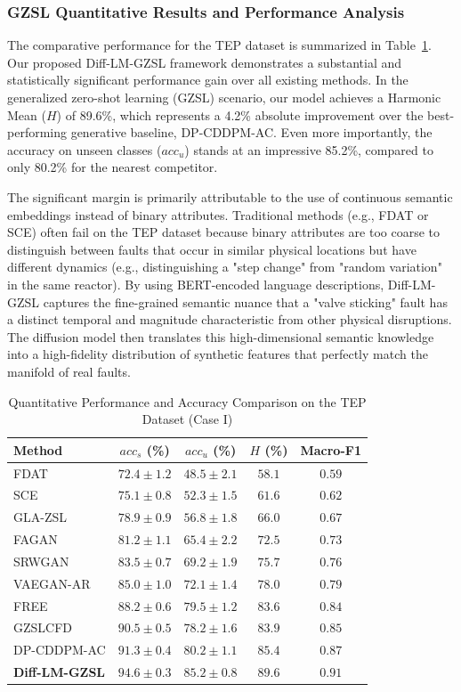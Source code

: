 \subsubsection{GZSL Quantitative Results and Performance Analysis}
The comparative performance for the TEP dataset is summarized in Table~\ref{tab:tep_results}. Our proposed Diff-LM-GZSL framework demonstrates a substantial and statistically significant performance gain over all existing methods. In the generalized zero-shot learning (GZSL) scenario, our model achieves a Harmonic Mean ($H$) of 89.6\%, which represents a 4.2\% absolute improvement over the best-performing generative baseline, DP-CDDPM-AC. Even more importantly, the accuracy on unseen classes ($acc_u$) stands at an impressive 85.2\%, compared to only 80.2\% for the nearest competitor.

The significant margin is primarily attributable to the use of continuous semantic embeddings instead of binary attributes. Traditional methods (e.g., FDAT or SCE) often fail on the TEP dataset because binary attributes are too coarse to distinguish between faults that occur in similar physical locations but have different dynamics (e.g., distinguishing a "step change" from "random variation" in the same reactor). By using BERT-encoded language descriptions, Diff-LM-GZSL captures the fine-grained semantic nuance that a "valve sticking" fault has a distinct temporal and magnitude characteristic from other physical disruptions. The diffusion model then translates this high-dimensional semantic knowledge into a high-fidelity distribution of synthetic features that perfectly match the manifold of real faults.

\begin{table}[htbp]
\centering
\caption{Quantitative Performance and Accuracy Comparison on the TEP Dataset (Case I)}
\label{tab:tep_results}
\begin{tabular}{lcccc}
\hline
Method & $acc_s$ (\%) & $acc_u$ (\%) & $H$ (\%) & Macro-F1 \\
\hline
FDAT & $72.4 \pm 1.2$ & $48.5 \pm 2.1$ & $58.1$ & $0.59$ \\
SCE & $75.1 \pm 0.8$ & $52.3 \pm 1.5$ & $61.6$ & $0.62$ \\
GLA-ZSL & $78.9 \pm 0.9$ & $56.8 \pm 1.8$ & $66.0$ & $0.67$ \\
FAGAN & $81.2 \pm 1.1$ & $65.4 \pm 2.2$ & $72.5$ & $0.73$ \\
SRWGAN & $83.5 \pm 0.7$ & $69.2 \pm 1.9$ & $75.7$ & $0.76$ \\
VAEGAN-AR & $85.0 \pm 1.0$ & $72.1 \pm 1.4$ & $78.0$ & $0.79$ \\
FREE & $88.2 \pm 0.6$ & $79.5 \pm 1.2$ & $83.6$ & $0.84$ \\
GZSLCFD & $90.5 \pm 0.5$ & $78.2 \pm 1.6$ & $83.9$ & $0.85$ \\
DP-CDDPM-AC & $91.3 \pm 0.4$ & $80.2 \pm 1.1$ & $85.4$ & $0.87$ \\
\textbf{Diff-LM-GZSL} & $\mathbf{94.6 \pm 0.3}$ & $\mathbf{85.2 \pm 0.8}$ & $\mathbf{89.6}$ & $\mathbf{0.91}$ \\
\hline
\end{tabular}
\end{table}

